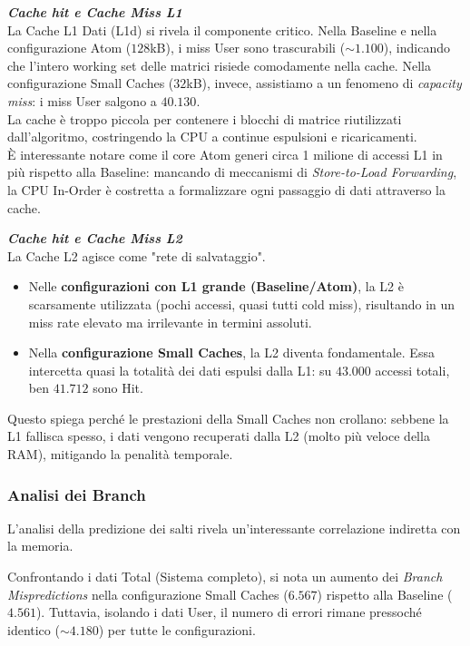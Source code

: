 \documentclass[../../main_document/main.tex]{subfiles}
\begin{document}
\vspace{8pt}
\noindent
\textbf{\textit{Cache hit e Cache Miss L1}}\\
La Cache L1 Dati (L1d) si rivela il componente critico. Nella Baseline e nella configurazione Atom ($128$kB), i miss User sono trascurabili ($\sim1.100$), indicando che l'intero working set delle matrici risiede comodamente nella cache. Nella configurazione Small Caches ($32$kB), invece, assistiamo a un fenomeno di \textit{capacity miss}: i miss User salgono a $40.130$.\\
La cache è troppo piccola per contenere i blocchi di matrice riutilizzati dall'algoritmo, costringendo la CPU a continue espulsioni e ricaricamenti.\\
È interessante notare come il core Atom generi circa 1 milione di accessi L1 in più rispetto alla Baseline: mancando di meccanismi di \textit{Store-to-Load Forwarding}, la CPU In-Order è costretta a formalizzare ogni passaggio di dati attraverso la cache.

\vspace{8pt}
\noindent
\textbf{\textit{Cache hit e Cache Miss L2}}\\
La Cache L2 agisce come "rete di salvataggio". 
\begin{itemize}[leftmargin=1em]
    \item Nelle \textbf{configurazioni con L1 grande (Baseline/Atom)}, la L2 è scarsamente utilizzata (pochi accessi, quasi tutti cold miss), risultando in un miss rate elevato ma irrilevante in termini assoluti. 
    \item Nella \textbf{configurazione Small Caches}, la L2 diventa fondamentale. Essa intercetta quasi la totalità dei dati espulsi dalla L1: su $43.000$ accessi totali, ben $41.712$ sono Hit. 
\end{itemize} 

\vspace{8pt}
\noindent
Questo spiega perché le prestazioni della Small Caches non crollano: sebbene la L1 fallisca spesso, i dati vengono recuperati dalla L2 (molto più veloce della RAM), mitigando la penalità temporale.

\subsubsection{Analisi dei Branch} 
L'analisi della predizione dei salti rivela un'interessante correlazione indiretta con la memoria.

\vspace{8pt}
\noindent
Confrontando i dati Total (Sistema completo), si nota un aumento dei \textit{Branch Mispredictions} nella configurazione Small Caches ($6.567$) rispetto alla Baseline ($4.561$). Tuttavia, isolando i dati User, il numero di errori rimane pressoché identico ($\sim4.180$) per tutte le configurazioni.
\end{document}
